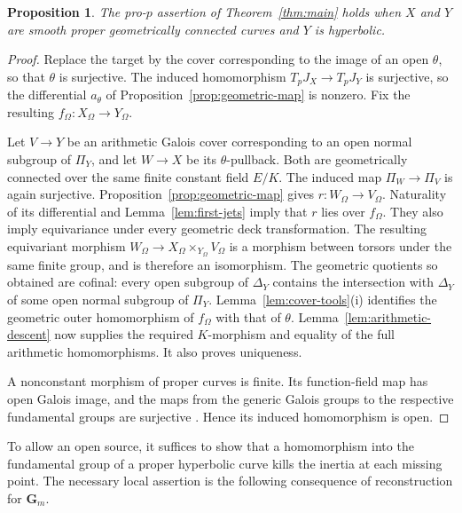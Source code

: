 \documentclass[11pt,a4paper]{article}
\numberwithin{equation}{section}
\theoremstyle{plain}
\newtheorem{proposition}[theorem]{Proposition}
\theoremstyle{definition}
\theoremstyle{remark}
\newcommand{\Gm}{\mathbf G_m}
\begin{document}
\begin{proposition}
\label{prop:proper-curves}
The pro-$p$ assertion of Theorem~\ref{thm:main} holds when $X$ and $Y$
are smooth proper geometrically connected curves and $Y$ is hyperbolic.
\end{proposition}
\begin{proof}
Replace the target by the cover corresponding to the image of an open
$\theta$, so that $\theta$ is surjective. The induced homomorphism
$T_pJ_X\to T_pJ_Y$ is surjective, so the differential
$a_\theta$ of Proposition~\ref{prop:geometric-map} is nonzero. Fix the
resulting $f_\Omega:X_\Omega\to Y_\Omega$.

Let $V\to Y$ be an arithmetic Galois cover corresponding to an open
normal subgroup of $\Pi_Y$, and let $W\to X$ be its $\theta$-pullback.
Both are geometrically connected over the same finite constant field
$E/K$. The induced map $\Pi_W\to\Pi_V$ is again surjective.
Proposition~\ref{prop:geometric-map} gives $r:W_\Omega\to V_\Omega$.
Naturality of its differential and Lemma~\ref{lem:first-jets} imply
that $r$ lies over $f_\Omega$.
They also imply equivariance under every geometric deck transformation.
The resulting equivariant morphism
$W_\Omega\to X_\Omega\times_{Y_\Omega}V_\Omega$ is a morphism
between torsors under the same finite group, and is therefore an
isomorphism. The geometric quotients so obtained are cofinal:
every open subgroup of $\Delta_Y$ contains the intersection with
$\Delta_Y$ of some open normal subgroup of $\Pi_Y$.
Lemma~\ref{lem:cover-tools}(i) identifies the geometric outer
homomorphism of $f_\Omega$ with that of $\theta$.
Lemma~\ref{lem:arithmetic-descent} now supplies the required $K$-morphism
and equality of the full arithmetic homomorphisms. It also proves
uniqueness.

A nonconstant morphism of proper curves is finite. Its function-field
map has open Galois image, and the maps from the generic Galois groups
to the respective fundamental groups are surjective
\cite[Expos\'e~V, Proposition~8.2]{SGA1}. Hence its induced homomorphism is open.
\end{proof}

To allow an open source, it suffices to show that a homomorphism into
the fundamental group of a proper hyperbolic curve kills the inertia
at each missing point. The necessary local assertion is the following
consequence of reconstruction for $\Gm$.
\end{document}
